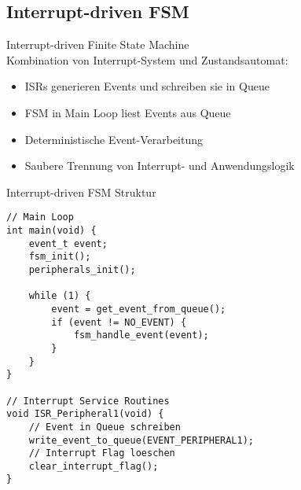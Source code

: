 \subsection{Interrupt-driven FSM}

\begin{concept}{Interrupt-driven Finite State Machine}\\
    Kombination von Interrupt-System und Zustandsautomat:
    \begin{itemize}
        \item ISRs generieren Events und schreiben sie in Queue
        \item FSM in Main Loop liest Events aus Queue
        \item Deterministische Event-Verarbeitung
        \item Saubere Trennung von Interrupt- und Anwendungslogik
    \end{itemize}
\end{concept}

\begin{code}{Interrupt-driven FSM Struktur}\\
\begin{lstlisting}[style=basesmol]
// Main Loop
int main(void) {
    event_t event;
    fsm_init();
    peripherals_init();
    
    while (1) {
        event = get_event_from_queue();
        if (event != NO_EVENT) {
            fsm_handle_event(event);
        }
    }
}

// Interrupt Service Routines
void ISR_Peripheral1(void) {
    // Event in Queue schreiben
    write_event_to_queue(EVENT_PERIPHERAL1);
    // Interrupt Flag loeschen
    clear_interrupt_flag();
}
\end{lstlisting}
\end{code}

